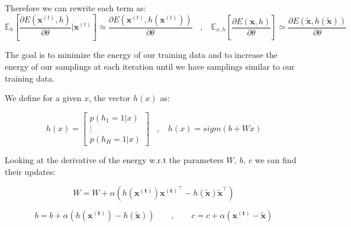\documentclass{article}
\begin{document}
Therefore we can rewrite each term as:
$$ \mathbb{E}_h \left[ \frac{\partial E(\mathbf{x}^{(t)} ,h)}{\partial \theta} | \mathbf{x}^{(t)} \right] \simeq \frac{\partial E(\mathbf{x}^{(t)} ,h(\mathbf{x}^{(t)}))}{\partial \theta} ~~~~,~~~~ \mathbb{E}_{x,h} \left[ \frac{\partial E(\mathbf{x} ,h)}{\partial \theta} \right] \simeq \frac{\partial E(\mathbf{\tilde x} ,h(\mathbf{\tilde x}))}{\partial \theta} $$

The goal is to minimize the energy of our training data and to increase the energy of our samplings at each iteration until we have samplings similar to our training data.

We define for a given $x$, the vector $h(x)$ as:

$$ h(x) =
\begin{bmatrix}
    p(h_1 = 1 | x)  \\
    \vdots \\
    p(h_H = 1 | x)
\end{bmatrix}
~~~~,~~~~ h(x) = sigm(b + Wx) $$

Looking at the derivative of the energy w.r.t the parameters $W, ~ b,~c$ we can find their updates:



\[ W = W + \alpha \left( h(\mathbf{x^{(t)}})\mathbf{x^{(t)}}^\top - h(\mathbf{\tilde x})\mathbf{\tilde x}^\top \right) \]


\[ b = b + \alpha \left(h(\mathbf{x^{(t)}}) - h(\mathbf{\tilde x}) \right)  ~~~~~~~~~,~~~~~~~~~ c = c + \alpha \left(\mathbf{x^{(t)}} - \mathbf{\tilde x} \right)\]




\end{document}
